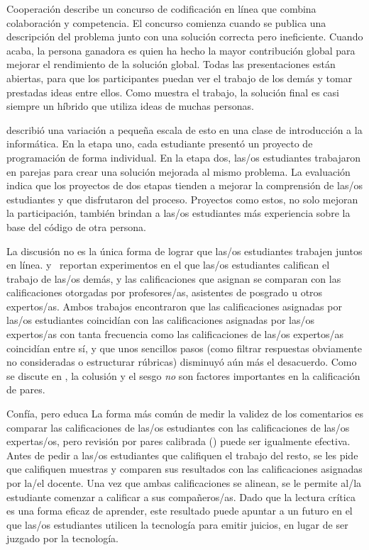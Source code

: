 \begin{aside}{Cooperación}
  \cite{Gull2004} describe un concurso de codificación en línea que combina colaboración y competencia.
  El concurso comienza cuando se publica una descripción del problema junto con una solución correcta pero ineficiente.
  Cuando acaba,
  la persona ganadora es quien ha hecho la mayor contribución global
  para mejorar el rendimiento de la solución global.
  Todas las presentaciones están abiertas,
  para que los participantes puedan ver el trabajo de los demás y tomar prestadas ideas entre ellos.
  Como muestra el trabajo,
  la solución final es casi siempre un híbrido que utiliza ideas de muchas personas.

  \cite{Batt2018} describió una variación a pequeña escala de esto en una clase de introducción a la informática.
  En la etapa uno,
  cada estudiante presentó un proyecto de programación de forma individual.
  En la etapa dos,
  las/os estudiantes trabajaron en parejas para crear una solución mejorada al mismo problema.
  La evaluación indica que los proyectos de dos etapas tienden a mejorar la comprensión de las/os estudiantes
  y que disfrutaron del proceso.
  Proyectos como estos, no solo mejoran la participación,
  también brindan a las/os estudiantes más experiencia sobre la base del código de otra persona.
\end{aside}

La discusión no es la única forma de lograr que las/os estudiantes trabajen juntos en línea.
\cite{Pare2008} y~\cite{Kulk2013} reportan experimentos
en el que las/os estudiantes califican el trabajo de las/os demás,
y las calificaciones que asignan se comparan con
las calificaciones otorgadas por profesores/as, asistentes de posgrado u otros expertos/as.
Ambos trabajos encontraron que las calificaciones asignadas por las/os estudiantes coincidían con las calificaciones asignadas por las/os expertos/as
con tanta frecuencia como las calificaciones de las/os expertos/as coincidían entre sí,
y que unos sencillos pasos
(como filtrar respuestas obviamente no consideradas o estructurar rúbricas)
disminuyó aún más el desacuerdo.
Como se discute en ,
la colusión y el sesgo \emph{no} son factores importantes en la calificación de pares.

\begin{aside}{Confía, pero educa}
  La forma más común de medir la validez de los comentarios
  es comparar las calificaciones de las/os estudiantes con las calificaciones de las/os expertas/os,
  pero revisión por pares calibrada () puede ser igualmente efectiva.
  Antes de pedir a las/os estudiantes que califiquen el trabajo del resto,
  se les pide que califiquen muestras y comparen sus resultados con las calificaciones asignadas por la/el docente.
  Una vez que ambas calificaciones se alinean,
  se le permite al/la estudiante comenzar a calificar a sus compañeros/as.
  Dado que la lectura crítica es una forma eficaz de aprender,
  este resultado puede apuntar a un futuro en el que las/os estudiantes utilicen la tecnología para emitir juicios,
  en lugar de ser juzgado por la tecnología.
\end{aside}

